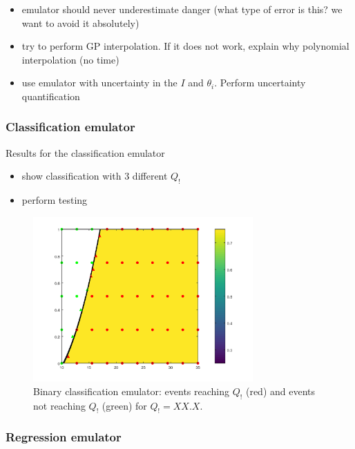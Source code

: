 \begin{itemize}
\itemsep0em
  \item emulator should never underestimate danger (what type of error is this? we want to avoid it absolutely)
  \item try to perform GP interpolation. If it does not work, explain why polynomial interpolation (no time)
  \item use emulator with uncertainty in the $I$ and $\theta_i$. Perform uncertainty quantification
\end{itemize}


\subsubsection{Classification emulator}

Results for the classification emulator
\begin{itemize}
  \item show classification with 3 different $Q_!$
  \item perform testing 
\end{itemize}

\begin{figure}[htpb]
  \centering
  \includegraphics[width=0.75\textwidth]{Figures/classification.png}
  \caption{Binary classification emulator: events reaching $Q_!$ (red) and events not reaching $Q_!$ (green) for $Q_! = XX.X$.}
  \label{fig:classification_Q1}
\end{figure}


\subsubsection{Regression emulator}

